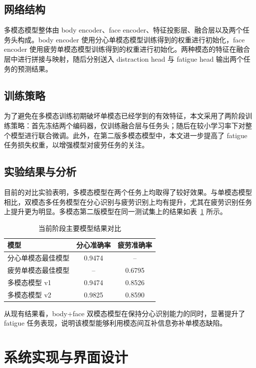 \documentclass[12pt]{ctexrep}
\begin{document}
\section{网络结构}
多模态模型整体由 body encoder、face encoder、特征投影层、融合层以及两个任务头构成。body encoder 使用分心单模态模型训练得到的权重进行初始化，face encoder 使用疲劳单模态模型训练得到的权重进行初始化。两种模态的特征在融合层中进行拼接与映射，随后分别送入 distraction head 与 fatigue head 输出两个任务的预测结果。

\section{训练策略}
为了避免在多模态训练初期破坏单模态已经学到的有效特征，本文采用了两阶段训练策略：首先冻结两个编码器，仅训练融合层与任务头；随后在较小学习率下对整个模型进行联合微调。此外，在第二版多模态模型中，本文进一步提高了 fatigue 任务损失权重，以增强模型对疲劳任务的关注。

\section{实验结果与分析}
目前的对比实验表明，多模态模型在两个任务上均取得了较好效果。与单模态模型相比，双模态多任务模型在分心识别与疲劳识别上均有提升，尤其在疲劳识别任务上提升更为明显。多模态第二版模型在同一测试集上的结果如表~\ref{tab:current-results} 所示。

\begin{table}[H]
    \centering
    \caption{当前阶段主要模型结果对比}
    \label{tab:current-results}
    \begin{tabular}{>{\raggedright}p{4.2cm}cc}
        \toprule
        模型 & 分心准确率 & 疲劳准确率 \\
        \midrule
        分心单模态最佳模型 & 0.9474 & -- \\
        疲劳单模态最佳模型 & -- & 0.6795 \\
        多模态模型 v1 & 0.9474 & 0.8526 \\
        多模态模型 v2 & 0.9825 & 0.8590 \\
        \bottomrule
    \end{tabular}
\end{table}

从现有结果看，body+face 双模态模型在保持分心识别能力的同时，显著提升了 fatigue 任务表现，说明该模型能够利用模态间互补信息弥补单模态缺陷。

\chapter{系统实现与界面设计}
\end{document}
